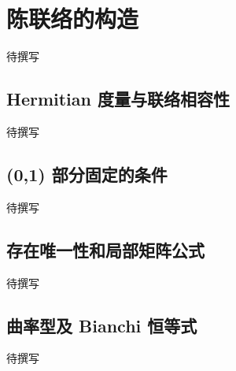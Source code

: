 
% 
% 

\section{陈联络的构造}
\label{g4:sec:1603}

待撰写

\subsection{Hermitian 度量与联络相容性}
\label{g4:subsec:1603:01}
待撰写

\subsection{(0,1) 部分固定的条件}
\label{g4:subsec:1603:02}
待撰写

\subsection{存在唯一性和局部矩阵公式}
\label{g4:subsec:1603:03}
待撰写

\subsection{曲率型及 Bianchi 恒等式}
\label{g4:subsec:1603:04}
待撰写
